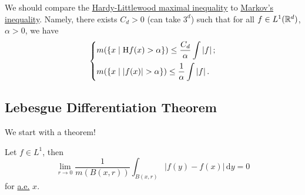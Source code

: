 We should compare the \hyperref[thm:HL-maximal-inequality]{Hardy-Littlewood maximal inequality} to \hyperref[lma:Markov-inequality]{Markov's inequality}.
Namely, there exists \(C_{d} >0\) (can take \(3^d\)) such that for all \(f\in L^1(\mathbb{\MakeUppercase{r}} ^d)\), \(\alpha > 0\), we have
\[
	\begin{dcases}
		m(\left\{x\mid \mathrm{H}f(x) > \alpha\right\})                \leq \frac{C_{d} }{\alpha }\int \left\vert f \right\vert; \\
		m(\left\{x\mid \left\vert f(x) \right\vert > \alpha \right\})  \leq \frac{1}{\alpha }\int \left\vert f \right\vert.
	\end{dcases}
\]

\subsection{Lebesgue Differentiation Theorem}
We start with a theorem!
\begin{theorem}\label{thm:Lebesgue-differentiation-theorem}
	Let \(f\in L^1\), then
	\[
		\lim\limits_{r \to 0} \frac{1}{m(B(x, r))}\int_{B(x, r)}\left\vert f(y) - f(x) \right\vert   \,\mathrm{d}y = 0
	\]
	for \hyperref[def:mu-almost-everywhere]{a.e.} \(x\).
\end{theorem}
